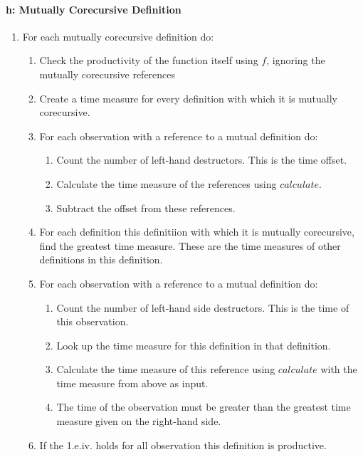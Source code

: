 \paragraph{h: Mutually Corecursive Definition}
\begin{enumerate}
\item For each mutually corecursive definition do:
\begin{enumerate}
\item Check the productivity of the function itself using $f$, ignoring the mutually corecursive references
\item Create a time measure for every definition with which it is mutually corecursive.
\item For each observation with a reference to a mutual definition do:
\begin{enumerate}
\item Count the number of left-hand destructors. This is the time offset.
\item Calculate the time measure of the references using $calculate$.
\item Subtract the offset from these references.
\end{enumerate}
\item For each definition this definitiion with which it is mutually corecursive, find the greatest time measure. These are the time measures of other definitions in this definition.
\item For each observation with a reference to a mutual definition do:
\begin{enumerate}
\item Count the number of left-hand side destructors. This is the time of this observation.
\item Look up the time measure for this definition in that definition.
\item Calculate the time measure of this reference using $calculate$ with the time measure from above as input.
\item The time of the observation must be greater than the greatest time measure given on the right-hand side.
\end{enumerate}
\item If the 1.e.iv. holds for all observation this definition is productive.
\end{enumerate}
\end{enumerate}
